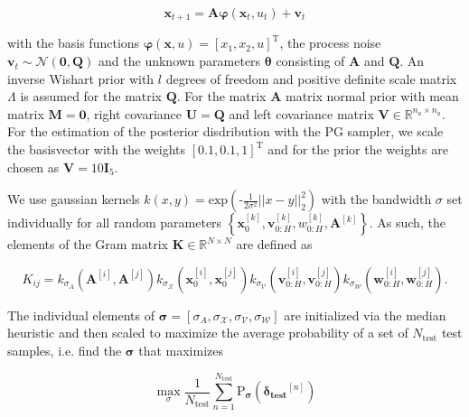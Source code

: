 \begin{equation} \label{State transition}
\boldsymbol{x}_{t+1} = \boldsymbol{A} \boldsymbol{\varphi}(\boldsymbol{x}_t, u_t) + \boldsymbol{v}_{t}
\end{equation}

with the basis functions $\boldsymbol{\varphi} (\boldsymbol{x}, u) = \left[ x_1,  x_2,  u \right]^\text{T}$, the process noise $\boldsymbol{v}_{t} \sim \mathcal{N} (\boldsymbol{0}, \boldsymbol{Q})$ and the unknown parameters $\boldsymbol{\theta}$ consisting of $\boldsymbol{A}$ and $\boldsymbol{Q}$. An inverse Wishart  prior with $l$ degrees of freedom and positive definite scale matrix $\Lambda$ is assumed for the matrix $\boldsymbol{Q}$. For the matrix $\boldsymbol{A}$ matrix normal prior with mean matrix $\boldsymbol{M} = \boldsymbol{0}$, right covariance $\boldsymbol{U} = \boldsymbol{Q}$ and left covariance matrix $\boldsymbol{V} \in \mathbb{R}^{n_a \times n_a}.$ For the estimation of the posterior disdribution with the PG sampler, we scale the basisvector with the weights $\left[ 0.1,  0.1,  1 \right]^\text{T}$ and for the prior the weights are chosen as $\boldsymbol{V} = 10 \boldsymbol{I}_5$.

We use gaussian kernels $k(x,y) = \text{exp}\left(\text{-}\frac{1}{2\sigma^2} ||x - y||_2^2 \right)$ with the bandwidth $\sigma$ set individually for all random parameters $\left\{\boldsymbol{x}_0^{[k]}, \boldsymbol{v}_{0:H}^{[k]}, w_{0:H}^{[k]},  \boldsymbol{A}^{[k]}\right\}$. As such, the elements of the Gram matrix $\boldsymbol{K} \in \mathbb{R}^{N \times N }$ are defined as

\begin{equation} \label{Kernel equation}
K_{ij} = k_{\sigma_A}(\boldsymbol{A}^{[i]}, \boldsymbol{A}^{[j]})  k_{\sigma_\mathcal{X}}(\boldsymbol{x}_0^{[i]}, \boldsymbol{x}_0^{[j]})    k_{\sigma_\mathcal{V}}(\boldsymbol{v}_{0:H}^{[i]}, \boldsymbol{v}_{0:H}^{[j]})  k_{\sigma_\mathcal{W}}(\boldsymbol{w}_{0:H}^{[i]}, \boldsymbol{w}_{0:H}^{[j]}).
\end{equation}

The individual elements of $\boldsymbol{\sigma} = [\sigma_A, \sigma_\mathcal{X}, \sigma_\mathcal{V}, \sigma_\mathcal{W}]$ are initialized via the median heuristic \cite{Damien_18} and then scaled to maximize the average probability of a set of $N_\text{test}$ test samples, i.e. find the $\boldsymbol{\sigma}$ that maximizes

 \begin{equation} \label{Average Probability}
\max\limits_{\sigma} \frac{1}{N_\text{test}}  \sum_{n= 1}^{N_\text{test}} \text{P}_{\boldsymbol{\sigma}} ( \boldsymbol{\delta_\text{test}}^{[n]} )
\end{equation}

